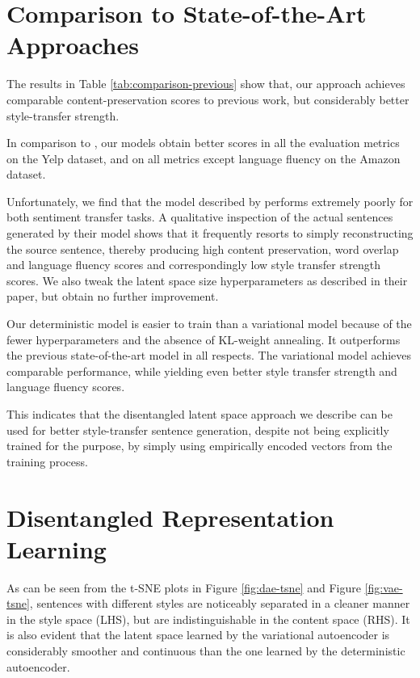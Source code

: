 \section{Comparison to State-of-the-Art Approaches}

The results in Table \ref{tab:comparison-previous} show that, our approach achieves comparable content-preservation scores to previous work, but considerably better style-transfer strength.

In comparison to \cite{shen2017style}, our models obtain better scores in all the evaluation metrics on the Yelp dataset, and on all metrics except language fluency on the Amazon dataset.

Unfortunately, we find that the model described by \cite{fu2017style} performs extremely poorly for both sentiment transfer tasks. A qualitative inspection of the actual sentences generated by their model shows that it frequently resorts to simply reconstructing the source sentence, thereby producing high content preservation, word overlap and language fluency scores and correspondingly low style transfer strength scores. We also tweak the latent space size hyperparameters as described in their paper, but obtain no further improvement.

Our deterministic model is easier to train than a variational model because of the fewer hyperparameters and the absence of KL-weight annealing. It outperforms the previous state-of-the-art model \citep{shen2017style} in all respects. The variational model achieves comparable performance, while yielding even better style transfer strength and language fluency scores.

This indicates that the disentangled latent space approach we describe can be used for better style-transfer sentence generation, despite not being explicitly trained for the purpose, by simply using empirically encoded vectors from the training process.


\section{Disentangled Representation Learning}

As can be seen from the t-SNE plots in Figure \ref{fig:dae-tsne} and Figure \ref{fig:vae-tsne}, sentences with different styles are noticeably separated in a cleaner manner in the style space (LHS), but are indistinguishable in the content space (RHS). It is also evident that the latent space learned by the variational autoencoder is considerably smoother and continuous than the one learned by the deterministic autoencoder.

